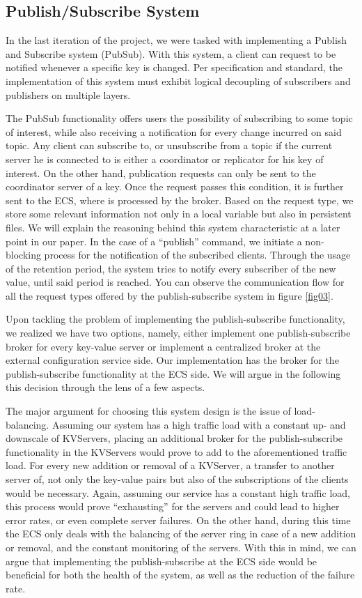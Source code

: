 \documentclass[sigconf]{acmart}
\begin{document}
\subsection{Publish/Subscribe System}
In the last iteration of the project, we were tasked with implementing a Publish and Subscribe system (PubSub). With this system, a client can request to be notified whenever a specific key is changed. Per specification and standard, the implementation of this system must exhibit logical decoupling of subscribers and publishers on multiple layers.

The PubSub functionality offers users the possibility of subscribing to some topic of interest, while also receiving a notification for every change incurred on said topic. Any client can subscribe to, or unsubscribe from a topic if the current server he is connected to is either a coordinator or replicator for his key of interest. On the other hand, publication requests can only be sent to the coordinator server of a key. Once the request passes this condition, it is further sent to the ECS, where is processed by the broker. Based on the request type, we store some relevant information not only in a local variable but also in persistent files. We will explain the reasoning behind this system characteristic at a later point in our paper. In the case of a “publish” command, we initiate a non-blocking process for the notification of the subscribed clients. Through the usage of the retention period, the system tries to notify every subscriber of the new value, until said period is reached.
You can observe the communication flow for all the request types offered by the publish-subscribe system in figure \ref{fig03}.

Upon tackling the problem of implementing the publish-subscribe functionality, we realized we have two options, namely, either implement one publish-subscribe broker for every key-value server or implement a centralized broker at the external configuration service side. Our implementation has the broker for the publish-subscribe functionality at the ECS side. We will argue in the following this decision through the lens of a few aspects.

The major argument for choosing this system design is the issue of load-balancing. Assuming our system has a high traffic load with a constant up- and downscale of KVServers, placing an additional broker for the publish-subscribe functionality in the KVServers would prove to add to the aforementioned traffic load.
For every new addition or removal of a KVServer, a transfer to another server of, not only the key-value pairs but also of the subscriptions of the clients would be necessary. Again, assuming our service has a constant high traffic load, this process would prove “exhausting” for the servers and could lead to higher error rates, or even complete server failures. On the other hand, during this time the ECS only deals with the balancing of the server ring in case of a new addition or removal, and the constant monitoring of the servers. With this in mind, we can argue that implementing the publish-subscribe at the ECS side would be beneficial for both the health of the system, as well as the reduction of the failure rate.
\end{document}
